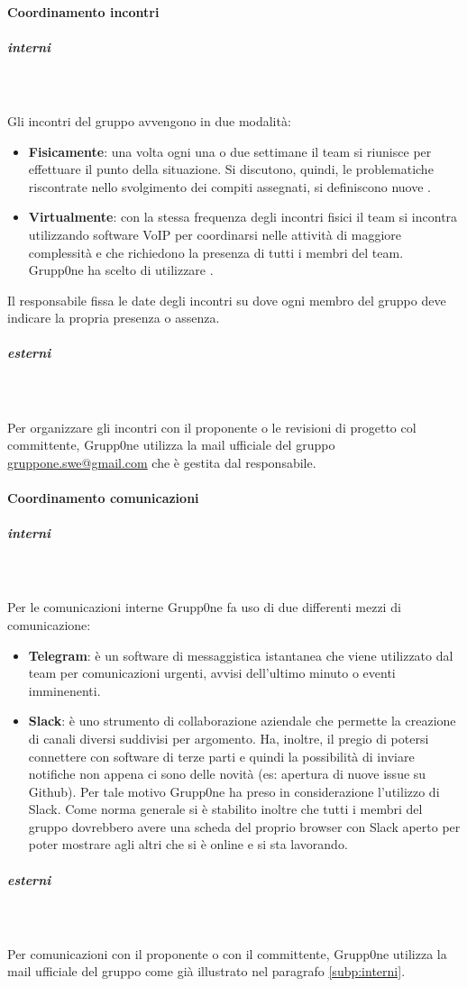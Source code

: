 \documentclass[../norme-di-progetto.tex]{subfiles}
\begin{document}
\paragraph{Coordinamento incontri}
\label{par:coordinamento incontri}
\subparagraph{interni}\mbox{}\\
\label{subp:interni}
\\Gli incontri del gruppo avvengono in due modalità:
\begin{itemize}
	\item \textbf{Fisicamente}: una volta ogni una o due settimane il team si riunisce per effettuare il punto della situazione. Si discutono, quindi, le problematiche riscontrate nello svolgimento dei compiti assegnati, si definiscono nuove .
	\item \textbf{Virtualmente}: con la stessa frequenza degli incontri fisici il team si incontra utilizzando software VoIP per coordinarsi nelle attività di maggiore complessità e che richiedono la presenza di tutti i membri del team. Grupp0ne ha scelto di utilizzare .
\end{itemize}
Il responsabile fissa le date degli incontri su  dove ogni membro del gruppo deve indicare la propria presenza o assenza.
\subparagraph{esterni}\mbox{}\\
\label{subp:esterni}
 \\Per organizzare gli incontri con il proponente o le revisioni di progetto col committente, Grupp0ne utilizza la mail ufficiale del gruppo \url{gruppone.swe@gmail.com} che è gestita dal responsabile.
\paragraph{Coordinamento comunicazioni}
\label{par:coordinamento comunicazioni}
\subparagraph{interni}\mbox{}\\
\label{subp:interni}
\\Per le comunicazioni interne Grupp0ne fa uso di due differenti mezzi di comunicazione:
\begin{itemize}
	\item \textbf{Telegram}: è un software di messaggistica istantanea che viene utilizzato dal team per comunicazioni urgenti, avvisi dell'ultimo minuto o eventi imminenenti.
	\item \textbf{Slack}: è uno strumento di collaborazione aziendale che permette la creazione di canali diversi suddivisi per argomento. Ha, inoltre, il pregio di potersi connettere con software di terze parti e quindi la possibilità di inviare notifiche non appena ci sono delle novità (es: apertura di nuove issue su Github). Per tale motivo Grupp0ne ha preso in considerazione l'utilizzo di Slack. Come norma generale si è stabilito inoltre che tutti i membri del gruppo dovrebbero avere una scheda del proprio browser con Slack aperto per poter mostrare agli altri che si è online e si sta lavorando.
\end{itemize}
\subparagraph{esterni}\mbox{}\\
\label{subp:interni}
\\Per comunicazioni con il proponente o con il committente, Grupp0ne utilizza la mail ufficiale del gruppo come già illustrato nel paragrafo \ref{subp:interni}.
\end{document}
